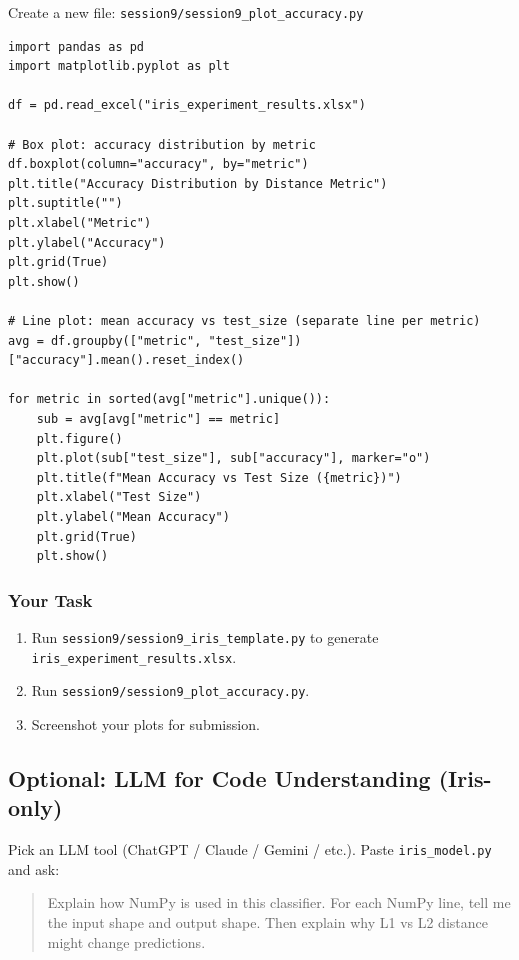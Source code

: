 Create a new file: \texttt{session9/session9\_plot\_accuracy.py}

\begin{verbatim}
import pandas as pd
import matplotlib.pyplot as plt

df = pd.read_excel("iris_experiment_results.xlsx")

# Box plot: accuracy distribution by metric
df.boxplot(column="accuracy", by="metric")
plt.title("Accuracy Distribution by Distance Metric")
plt.suptitle("")
plt.xlabel("Metric")
plt.ylabel("Accuracy")
plt.grid(True)
plt.show()

# Line plot: mean accuracy vs test_size (separate line per metric)
avg = df.groupby(["metric", "test_size"])["accuracy"].mean().reset_index()

for metric in sorted(avg["metric"].unique()):
    sub = avg[avg["metric"] == metric]
    plt.figure()
    plt.plot(sub["test_size"], sub["accuracy"], marker="o")
    plt.title(f"Mean Accuracy vs Test Size ({metric})")
    plt.xlabel("Test Size")
    plt.ylabel("Mean Accuracy")
    plt.grid(True)
    plt.show()
\end{verbatim}

\subsubsection{Your Task}
\begin{enumerate}\setlength{\itemsep}{2pt}
\item Run \texttt{session9/session9\_iris\_template.py} to generate \texttt{iris\_experiment\_results.xlsx}.
\item Run \texttt{session9/session9\_plot\_accuracy.py}.
\item Screenshot your plots for submission.
\end{enumerate}

\newpage
\subsection{Optional: LLM for Code Understanding (Iris-only)}

\noindent
Pick an LLM tool (ChatGPT / Claude / Gemini / etc.). Paste \texttt{iris\_model.py} and ask:

\begin{quote}
    Explain how NumPy is used in this classifier. For each NumPy line, tell me the input shape and output shape. Then explain why L1 vs L2 distance might change predictions.
\end{quote}

